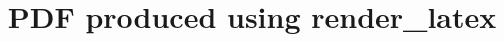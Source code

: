 \documentclass[landscape, 12pt]{article}
\begin{document}
    \title{PDF produced using render_latex}

    
\end{document}
